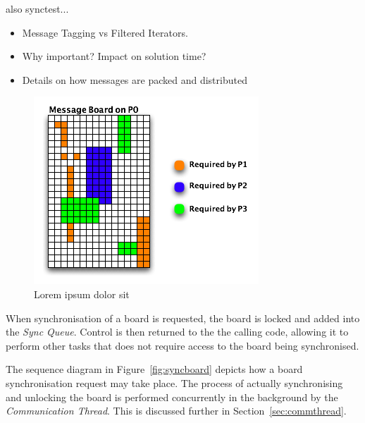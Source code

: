 also synctest...

\begin{itemize}
\item Message Tagging vs Filtered Iterators.
\item Why important? Impact on solution time?
\item Details on how messages are packed and distributed
\end{itemize} 

\begin{figure}[h]
 \centering
  \includegraphics[scale=0.70]{taggedboard.png}
 \caption{Lorem ipsum dolor sit}
 \label{fig:taggedboard}
\end{figure}

When synchronisation of a board is requested, the board is locked and added into the \textit{Sync Queue}. Control is then returned to the the calling code, allowing it to perform other tasks that does not require access to the board being synchronised. 

The sequence diagram in  Figure~\ref{fig:syncboard} depicts how a board synchronisation request may take place. The process of actually synchronising and unlocking the board is performed concurrently in the background by the \textit{Communication Thread}. This is discussed further in Section~\ref{sec:commthread}.

